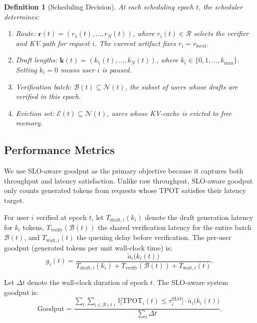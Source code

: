 \documentclass[journal]{IEEEtran}
\newtheorem{definition}{Definition}
\newcommand{\ind}{\mathbb{I}}
\begin{document}
\begin{definition}[Scheduling Decision]
At each scheduling epoch $t$, the scheduler determines:
\begin{enumerate}
    \item \textit{Route:}
    $\mathbf{r}(t)=(r_1(t),\ldots,r_N(t))$, where
    $r_i(t)\in\mathcal{R}$ selects the verifier and KV path for
    request $i$. The current artifact fixes $r_i=r_{\mathrm{local}}$.

    \item \textit{Draft lengths:} 
    $\mathbf{k}(t) = (k_1(t), \ldots, k_N(t))$, 
    where $k_i \in \{0, 1, \ldots, k_{\max}\}$. 
    Setting $k_i = 0$ means user $i$ is paused.
    
    \item \textit{Verification batch:} 
    $\mathcal{B}(t) \subseteq \mathcal{N}(t)$, the 
    subset of users whose drafts are verified in 
    this epoch.
    
    \item \textit{Eviction set:} 
    $\mathcal{E}(t) \subseteq \mathcal{N}(t)$, 
    users whose KV-cache is evicted to free memory.
\end{enumerate}
\end{definition}

\subsection{Performance Metrics}
\label{sec:model-metrics}

We use SLO-aware goodput as the primary objective because it 
captures both throughput and latency satisfaction. Unlike raw 
throughput, SLO-aware goodput only counts generated tokens from 
requests whose TPOT satisfies their latency target.

For user $i$ verified at epoch $t$, let 
$T_{\text{draft},i}(k_i)$ denote the draft generation 
latency for $k_i$ tokens, $T_{\text{verify}}(\mathcal{B}(t))$ 
the shared verification latency for the entire batch 
$\mathcal{B}(t)$, and $T_{\text{wait},i}(t)$ the queuing 
delay before verification. The per-user goodput 
(generated tokens per unit wall-clock time) is:
\begin{equation}
    \label{eq:per-user-goodput}
    g_i(t) = \frac{\tilde{a}_i\bigl(k_i(t)\bigr)}
    {T_{\text{draft},i}(k_i) + 
     T_{\text{verify}}(\mathcal{B}(t)) + 
     T_{\text{wait},i}(t)}.
\end{equation}

Let $\Delta t$ denote the wall-clock duration of epoch $t$. 
The SLO-aware system goodput is:
\begin{equation}
    \label{eq:sys-goodput}
    \mathrm{Goodput} = 
    \frac{\sum_t \sum_{i \in \mathcal{B}(t)} 
    \ind\bigl[\text{TPOT}_i(t) \leq \tau_i^{\text{SLO}}\bigr]
    \cdot \tilde{a}_i\bigl(k_i(t)\bigr)}
    {\sum_t \Delta t}.
\end{equation}
\end{document}
